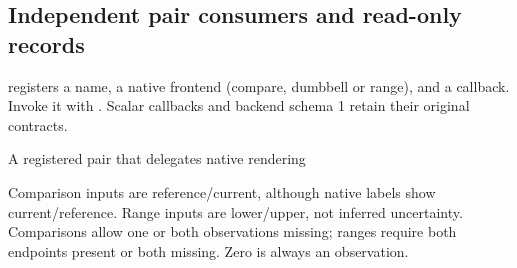 \clearpage
\subsection{Independent pair consumers and read-only records}
\label{sec:pair-extensions-en}
\key{\gradbarsdeclarepairtype} registers a name, a native frontend
(compare, dumbbell or range), and a callback. Invoke it with
.
Scalar callbacks and backend schema 1 retain their original contracts.
\begin{demo}{A registered pair that delegates native rendering}
\end{demo}
Comparison inputs are reference/current, although native labels show
current/reference. Range inputs are lower/upper, not inferred uncertainty.
Comparisons allow one or both observations missing; ranges require both
endpoints present or both missing. Zero is always an observation.

